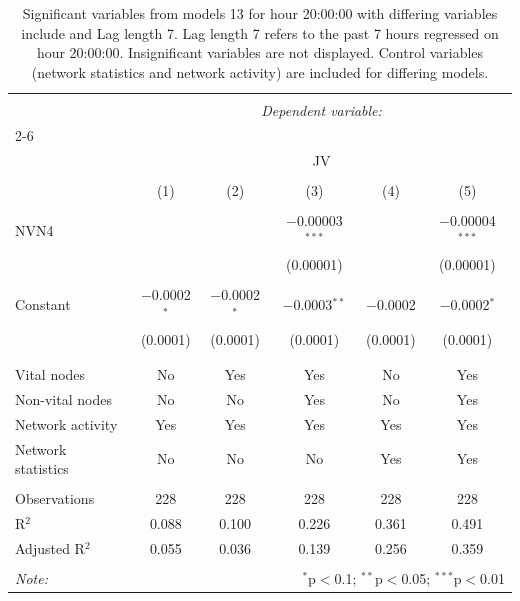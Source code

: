
\begin{table}[!htbp] \centering 
  \caption{Significant variables from models 13 for hour 20:00:00 with differing variables include 
                               and Lag length 7. Lag length 7 refers to the past 7 hours regressed on hour 20:00:00. 
                               Insignificant variables are not displayed. 
                               Control variables (network statistics and network activity) are 
                               included for differing models.} 
  \label{Jmodels1_t_hourlagged7} 
\scriptsize 
\begin{tabular}{@{\extracolsep{5pt}}lccccc} 
\\[-1.8ex]\hline 
\hline \\[-1.8ex] 
 & \multicolumn{5}{c}{\textit{Dependent variable:}} \\ 
\cline{2-6} 
\\[-1.8ex] & \multicolumn{5}{c}{JV} \\ 
\\[-1.8ex] & (1) & (2) & (3) & (4) & (5)\\ 
\hline \\[-1.8ex] 
 NVN4 &  &  & $-$0.00003$^{***}$ &  & $-$0.00004$^{***}$ \\ 
  &  &  & (0.00001) &  & (0.00001) \\ 
  & & & & & \\ 
 Constant & $-$0.0002$^{*}$ & $-$0.0002$^{*}$ & $-$0.0003$^{**}$ & $-$0.0002 & $-$0.0002$^{*}$ \\ 
  & (0.0001) & (0.0001) & (0.0001) & (0.0001) & (0.0001) \\ 
  & & & & & \\ 
\hline \\[-1.8ex] 
Vital nodes & No & Yes & Yes & No & Yes \\ 
Non-vital nodes & No & No & Yes & No & Yes \\ 
Network activity & Yes & Yes & Yes & Yes & Yes \\ 
Network statistics & No & No & No & Yes & Yes \\ 
\hline &  &  &  &  &  \\ 
Observations & 228 & 228 & 228 & 228 & 228 \\ 
R$^{2}$ & 0.088 & 0.100 & 0.226 & 0.361 & 0.491 \\ 
Adjusted R$^{2}$ & 0.055 & 0.036 & 0.139 & 0.256 & 0.359 \\ 
\hline 
\hline \\[-1.8ex] 
\textit{Note:}  & \multicolumn{5}{r}{$^{*}$p$<$0.1; $^{**}$p$<$0.05; $^{***}$p$<$0.01} \\ 
\end{tabular} 
\end{table} 
